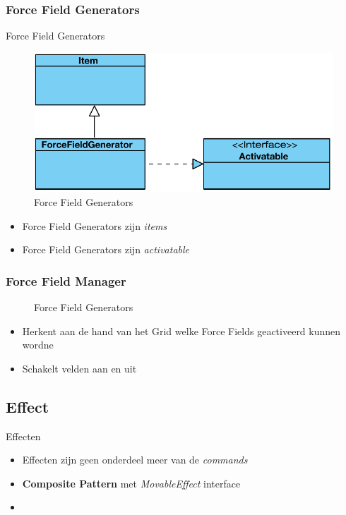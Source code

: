 \documentclass[t]{beamer}
\begin{document}
\subsubsection{Force Field Generators}
\begin{frame}{Force Field Generators}
\begin{figure}
	\center
	\includegraphics[width= 0.5\linewidth]{img/forcefieldgenerator.pdf}
	\caption{Force Field Generators}
\end{figure}
\begin{itemize}
	\item Force Field Generators zijn \textit{items}
	\item Force Field Generators zijn \textit{activatable}
\end{itemize}
\end{frame}

\subsubsection{Force Field Manager}
\begin{frame}
\begin{figure}
	\center
	\caption{Force Field Generators}
\end{figure}
\begin{itemize}
	\item Herkent aan de hand van het Grid welke Force Fields geactiveerd kunnen wordne
	\item Schakelt velden aan en uit
\end{itemize}
\end{frame}

\subsection{Effect}
\begin{frame}{Effecten}
\begin{itemize}
	\item Effecten zijn geen onderdeel meer van de \textit{commands}
	\item \textbf{Composite Pattern} met \textit{MovableEffect} interface
	\item 
\end{itemize}
\end{frame}
\end{document}
